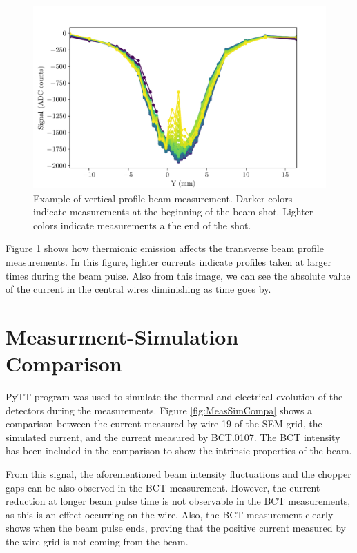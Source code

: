\begin{figure}[h]
    \centering
    \includegraphics[width=0.75\columnwidth]{Figure_ThermionicMeasurements/ProfileJth.pdf}
    \caption{Example of vertical profile beam measurement. Darker colors indicate measurements at the beginning of the beam shot. Lighter colors indicate measurements a the end of the shot. }
    \label{fig:JthInProf}
\end{figure}

Figure \ref{fig:JthInProf} shows how thermionic emission affects the transverse beam profile measurements. In this figure, lighter currents indicate profiles taken at larger times during the beam pulse. Also from this image, we can see the absolute value of the current in the central wires diminishing as time goes by. 

\section{Measurment-Simulation Comparison}

PyTT program was used to simulate the thermal and electrical evolution of the detectors during the measurements. Figure \ref{fig:MeasSimCompa} shows a comparison between the current measured by wire 19 of the SEM grid, the simulated current, and the current measured by BCT.0107. The BCT intensity has been included in the comparison to show the intrinsic properties of the beam.

From this signal, the aforementioned beam intensity fluctuations and the chopper gaps can be also observed in the BCT measurement. However, the current reduction at longer beam pulse time is not observable in the BCT measurements, as this is an effect occurring on the wire. Also, the BCT measurement clearly shows when the beam pulse ends, proving that the positive current measured by the wire grid is not coming from the beam. 

